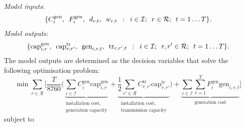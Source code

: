 \documentclass[preprint]{elsarticle}
\begin{document}
\noindent \textit{Model inputs}:
\begin{equation}
  \{C_{i}^\text{gen}, \hspace{0.5em} F_{i}^\text{gen}, \hspace{0.5em} d_{r, t}, \hspace{0.5em} w_{r, t} \hspace{0.5em} : \hspace{0.5em} i \in \mathcal{I}; \hspace{0.5em} r \in \mathcal{R}; \hspace{0.5em} t = 1 \ldots T\}.
\label{eq:model_3:inputs}
\end{equation}
\textit{Model outputs:}
\begin{equation}
\{\text{cap}_{i,r}^\text{gen}, \hspace{0.5em} \text{cap}_{r,r'}^\text{tr}, \hspace{0.5em} \text{gen}_{i,r,t}, \hspace{0.5em} \text{tr}_{r,r',t} \hspace{0.5em} : \hspace{0.5em} i \in \mathcal{I}; \hspace{0.5em} r,r' \in \mathcal{R}; \hspace{0.5em} t = 1 \ldots T\}.
\label{eq:model_3:decision_variables}
\end{equation}
The model outputs are determined as the decision variables that solve the following optimisation problem:
\begin{equation}
\min \sum_{r \in \mathcal{R}} \Bigg[ \frac{T}{8760} \Bigg( \underbrace{\sum_{i \in \mathcal{I}} C_i^\text{gen} \text{cap}_{i,r}^\text{gen}}_{\substack{\text{installation cost,} \\ \text{generation capacity}}} + \underbrace{ \frac{1}{2} \sum_{r' \in \mathcal{R}} C_{r,r'}^\text{tr} \text{cap}_{r,r'}^\text{tr} }_{\substack{\text{installation cost,} \\ \text{transmission capacity}}} \Bigg) + \underbrace{ \sum_{i \in \mathcal{I}} \sum_{t=1}^{T} F_i^\text{gen} \text{gen}_{i,r,t}}_\text{generation cost} \Bigg]
\label{eq:model_3:objective}
\end{equation}
\noindent subject to
\end{document}
